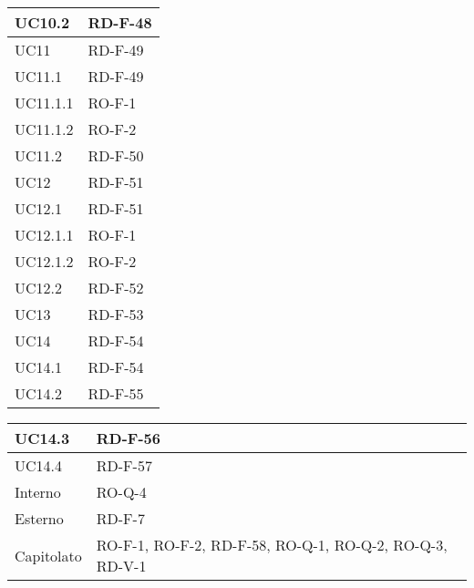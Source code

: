 \begin{center}
\begin{tabular}{ |m{8em}|m{13em}| }
    \hline
    UC10.2      &   RD-F-48 \\
    \hline
    UC11        &   RD-F-49 \\
    \hline
    UC11.1      &   RD-F-49 \\
    \hline
    UC11.1.1    &   RO-F-1 \\
    \hline
    UC11.1.2    &   RO-F-2 \\
    \hline
    UC11.2      &   RD-F-50 \\
    \hline
    UC12        &   RD-F-51 \\
    \hline
    UC12.1      &   RD-F-51 \\
    \hline
    UC12.1.1    &   RO-F-1 \\
    \hline
    UC12.1.2    &   RO-F-2 \\
    \hline
    UC12.2      &   RD-F-52 \\
    \hline
    UC13        &   RD-F-53 \\
    \hline
    UC14        &   RD-F-54 \\
    \hline
    UC14.1      &   RD-F-54 \\
    \hline
    UC14.2      &   RD-F-55 \\
    \hline
    \end{tabular}
    \newpage
    \begin{tabular}{ |m{8em}|m{13em}| }
    \hline
    UC14.3      &   RD-F-56 \\
    \hline
    UC14.4      &   RD-F-57 \\
    \hline
    Interno     &   RO-Q-4 \\
    \hline
    Esterno     &   RD-F-7 \\
    \hline
    Capitolato  &   RO-F-1, RO-F-2, RD-F-58, RO-Q-1, RO-Q-2, RO-Q-3, RD-V-1 \\
    \hline
\end{tabular}
\end{center}
